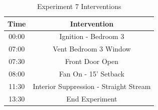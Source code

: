 \documentclass{article}
\begin{document}
\begin{table}[H]
	\centering
	\caption{Experiment 7 Interventions}
	\begin{tabular}{|c|c|} 
		\hline
		Time & Intervention \\ \hline \hline
		00:00 & Ignition - Bedroom 3 \\ \hline
		07:00 & Vent Bedroom 3 Window \\ \hline
		07:30 & Front Door Open \\ \hline
		08:00 & Fan On - 15' Setback \\ \hline
		11:30 & Interior Suppression - Straight Stream\\ \hline
		13:30 & End Experiment\\ \hline
	\end{tabular}
	\label{Table:Exp7Interventions}
\end{table}

\clearpage
\end{document}
